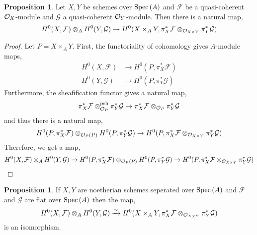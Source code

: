 \documentclass[12pt]{extarticle}
\theoremstyle{definition}
\newtheorem{proposition}[theorem]{Proposition}
\newcommand{\F}{\mathcal{F}}
\newcommand{\G}{\mathcal{G}}
\begin{document}
\begin{proposition}
Let $X, Y$ be schemes over $\mathrm{Spec}\left(A\right)$ and $\F$ be a quasi-coherent $\mathcal{O}_{X}$-module and $\G$ a quasi-coherent $\mathcal{O}_{Y}$-module. Then there is a natural map,
\[ H^0(X, \F) \otimes_A H^0(Y, \G) \to H^0(X \times_A Y, \pi^*_X \F \otimes_{\struct{X \times Y}} \pi^*_Y \G) \]
\end{proposition}

\begin{proof}
Let $P = X \times_A Y$. First, the functoriality of cohomology gives $A$-module maps,
\begin{align*}
H^0(X, \F) & \to H^0(P, \pi_X^{*} \F)
\\
H^0(Y, \G) & \to H^0(P, \pi_Y^{*} \G)
\end{align*}
Furthermore, the sheafification functor gives a natural map,
\[  \pi^*_X \F \otimes_{\struct{P}}^{\text{psh}} \pi^*_Y \G \to \pi^*_X \F \otimes_{\struct{P}} \pi^*_Y \G \]
and thus there is a natural map,
\[ H^0(P, \pi_X^* \F) \otimes_{\struct{P}(P)} H^0(P, \pi_Y^* \G) \to H^0(P, \pi^*_X \F \otimes_{\struct{X \times Y}} \pi^*_Y \G) \]
Therefore, we get a map,
\begin{align*}
H^0(X, \F) \otimes_A H^0(Y, \G) \to  H^0(P, \pi_X^* \F) \otimes_{\struct{P}(P)} H^0(P, \pi_Y^* \G) \to H^0(P, \pi^*_X \F \otimes_{\struct{X \times Y}} \pi^*_Y \G)
\end{align*}
\end{proof}

\begin{proposition}
If $X, Y$ are noetherian schemes seperated over $\mathrm{Spec}\left(A\right)$ and $\F$ and $\G$ are flat over $\mathrm{Spec}\left(A\right)$ then the map,
\[ H^0(X, \F) \otimes_A H^0(Y, \G) \xrightarrow{\sim} H^0(X \times_A Y, \pi^*_X \F \otimes_{\struct{X \times Y}} \pi^*_Y \G) \]
is an isomorphism. 
\end{proposition}
\end{document}
